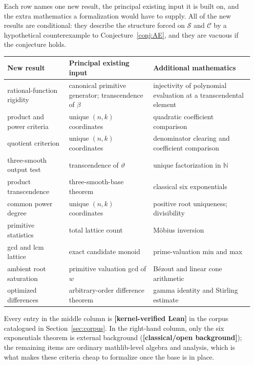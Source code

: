 \documentclass[11pt,oneside]{article}
\theoremstyle{definition}
\theoremstyle{remark}
\newcommand{\N}{\mathbb N}
\newcommand{\thetaq}{\vartheta}
\newcommand{\Sol}{\mathcal S}
\newcommand{\Cand}{\mathcal C}
\newcommand{\statuslean}{\textcolor{leanblue}{\textbf{[kernel-verified Lean]}}}
\newcommand{\statusknown}{\textcolor{classicalgray}{\textbf{[classical/\allowbreak open background]}}}
\begin{document}
Each row names one new result, the principal existing input it is built on, and the extra
mathematics a formalization would have to supply.  All of the new results are conditional:
they describe the structure forced on $\Sol$ and $\Cand$ by a hypothetical counterexample to
Conjecture~\ref{conj:AE}, and they are vacuous if the conjecture holds.

\begin{center}
\small
\begin{tabular}{@{}p{}p{}p{}@{}}
\toprule
New result & Principal existing input & Additional mathematics \\
\midrule
rational-function rigidity &
canonical primitive generator; transcendence of $\beta$ &
injectivity of polynomial evaluation at a transcendental element \\
\addlinespace
product and power criteria &
unique $(n,k)$ coordinates &
quadratic coefficient comparison \\
\addlinespace
quotient criterion &
unique $(n,k)$ coordinates &
denominator clearing and coefficient comparison \\
\addlinespace
three-smooth output test &
transcendence of $\thetaq$ &
unique factorization in $\N$ \\
\addlinespace
product transcendence &
three-smooth-base theorem &
classical six exponentials \\
\addlinespace
common power degree &
unique $(n,k)$ coordinates &
positive root uniqueness; divisibility \\
\addlinespace
primitive statistics &
total lattice count &
M\"obius inversion \\
\addlinespace
gcd and lcm lattice &
exact candidate monoid &
prime-valuation min and max \\
\addlinespace
ambient root saturation &
primitive valuation gcd of $w$ &
B\'ezout and linear cone arithmetic \\
\addlinespace
optimized differences &
arbitrary-order difference theorem &
gamma identity and Stirling estimate \\
\bottomrule
\end{tabular}
\end{center}

Every entry in the middle column is \statuslean{} in the corpus catalogued in
Section~\ref{sec:corpus}.  In the right-hand column, only the six exponentials theorem is
external background (\statusknown); the remaining items are ordinary mathlib-level algebra
and analysis, which is what makes these criteria cheap to formalize once the base is in
place.
\end{document}
